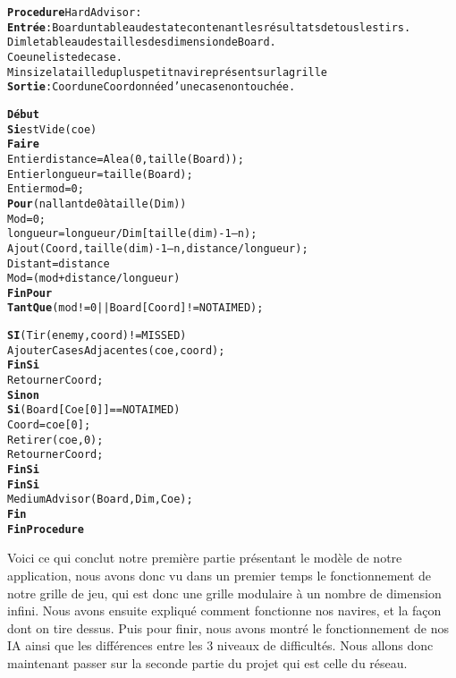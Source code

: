 \begin{alltt}
{\bf Procedure} HardAdvisor :
    {\bf Entrée} : Board un tableau de state contenant les résultats de tous les tirs.
              Dim le tableau des tailles des dimension de Board.
              Coe une liste de case.
              Minsize la taille du plus petit navire présent sur la grille
    {\bf Sortie} : Coord une Coordonnée d’une case non touchée.

    {\bf Début}
        {\bf Si} estVide(coe)
            {\bf Faire}
                Entier distance = Alea(0, taille(Board)) ;
                Entier longueur = taille(Board) ;
                Entier mod = 0 ;
                {\bf Pour} (n allant de 0 à taille(Dim))
                    Mod = 0 ;	
                    longueur = longueur / Dim[taille(dim) - 1 – n) ;
                    Ajout(Coord, taille(dim) - 1 – n, distance / longueur) ;
                    Distant = distance % longueur
                    Mod = (mod + distance /longueur) % minsize;
                {\bf FinPour}
            {\bf Tant Que}(mod != 0 || Board[Coord] != NOTAIMED) ;

            {\bf SI} (Tir(enemy, coord) != MISSED)
                AjouterCasesAdjacentes(coe, coord) ;
            {\bf FinSi}   
            Retourner Coord ;
        {\bf Sinon}
            {\bf Si} (Board[Coe[0]] == NOTAIMED)
                Coord = coe[0] ;
                Retirer(coe, 0) ;
                Retourner Coord ;
            {\bf FinSi}
        {\bf FinSi}
        MediumAdvisor(Board, Dim, Coe) ;
    {\bf Fin}
{\bf Fin Procedure}
\end{alltt}
    
    Voici ce qui conclut notre première partie présentant le modèle de notre application, nous avons donc vu dans un premier temps le fonctionnement de notre grille de jeu, qui est donc une grille modulaire à un nombre de dimension infini. Nous avons ensuite expliqué comment fonctionne nos navires, et la façon dont on tire dessus. Puis pour finir, nous avons montré le fonctionnement de nos IA ainsi que les différences entre les 3 niveaux de difficultés.
    Nous allons donc maintenant passer sur la seconde partie du projet qui est celle du réseau.
